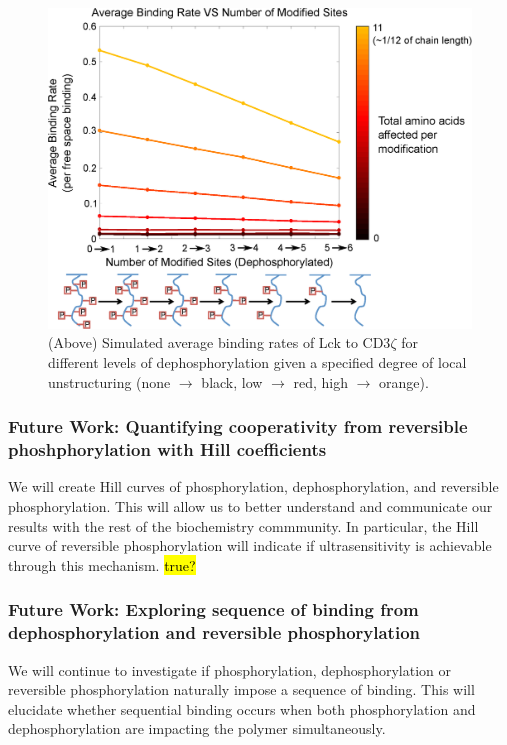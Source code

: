 \documentclass[../../AdvancementSummary.tex]{subfiles}
\begin{document}
\begin{figure}[H]
	\begin{center}
		\includegraphics[width=0.8\linewidth]{ResultsFigures/CD3ZetaStiffeningMembraneOn/Dephosphorylation/AvgBindVSTotalModified5.eps}
		\caption{(Above) Simulated average binding rates of Lck to CD3$\zeta$ for different levels of dephosphorylation given a specified degree of local unstructuring (none $\rightarrow$ black, low $\rightarrow$ red, high $\rightarrow$ orange).\label{fig: DephosMemOnCoop}}
	\end{center}
\end{figure}


\subsubsection{Future Work: Quantifying cooperativity from reversible phoshphorylation with Hill coefficients}

We will create Hill curves of phosphorylation, dephosphorylation, and reversible phosphorylation.  This will allow us to better understand and communicate our results with the rest of the biochemistry commmunity. In particular, the Hill curve of reversible phosphorylation will indicate if ultrasensitivity is achievable through this mechanism. \hl{true?}

\subsubsection{Future Work: Exploring sequence of binding from dephosphorylation and reversible phosphorylation}

We will continue to investigate if phosphorylation, dephosphorylation or reversible phosphorylation naturally impose a sequence of binding. This will elucidate whether sequential binding occurs when both phosphorylation and dephosphorylation are impacting the polymer simultaneously. 
\end{document}
